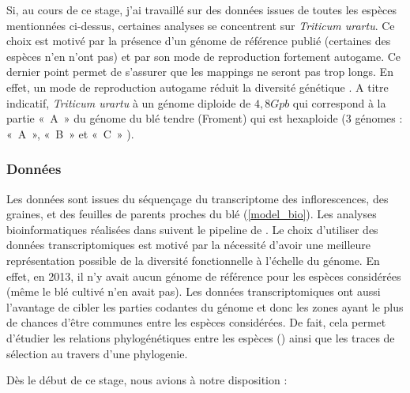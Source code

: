 \documentclass[../main]{subfiles} %
\begin{document}
Si, au cours de ce stage, j’ai travaillé sur des données issues de toutes les espèces mentionnées ci-dessus,  certaines  analyses se concentrent sur \textit{Triticum urartu}. Ce choix est motivé par la présence d'un génome de référence publié (certaines des espèces n'en n'ont pas) et par son mode de reproduction fortement \gls{autogame}. Ce dernier point permet de s'assurer que les \glspl{mapping} ne seront pas trop longs. En effet, un mode de reproduction \gls{autogame} réduit la diversité génétique \cite{burgarella_mating_2024}. A titre indicatif, \textit{Triticum urartu} à un génome \gls{diploide} de $4,8 Gpb$  qui correspond à la partie « A » du génome du blé tendre (Froment) qui est \gls{hexaploide} (3 génomes : « A », « B » et « C »  \cite{noauthor_ble_2024}).


\subsubsection{Données}
\label{sec:donnees}



Les  données sont issues du \gls{séquençage} du \gls{transcriptome}
des \glspl{inflorescence}, des graines, et des feuilles de parents proches du blé (\cref{model_bio}). Les analyses bioinformatiques réalisées dans  \cite{burgarella_mating_2024} suivent le pipeline de \cite{sarah_large_2017}. 
Le choix d’utiliser des données \glspl{transcriptomique} est motivé par la nécessité d'avoir une meilleure représentation possible de la diversité fonctionnelle à l'échelle du génome. En effet, en 2013, il n'y avait aucun génome de référence pour les espèces considérées (même le blé cultivé n'en avait pas). Les données \glspl{transcriptomique} ont aussi l'avantage de cibler les parties codantes du génome et donc les zones ayant le plus de chances d’être communes entre les espèces considérées. De fait, cela permet d’étudier les relations phylogénétiques entre les espèces (\cite{glemin_pervasive_2019}) ainsi que les traces de sélection au travers d'une \gls{phylogenie}. 


Dès le début de ce stage, nous avions à notre disposition :
\end{document}
